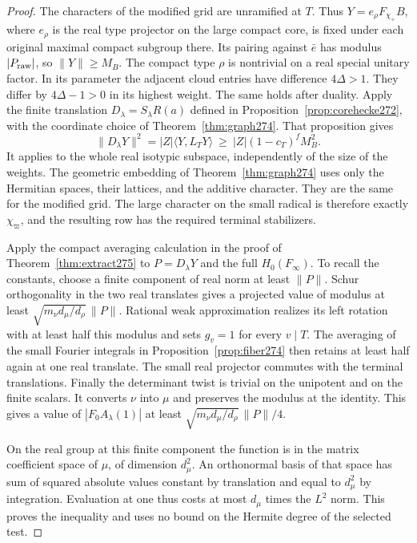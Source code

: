 \documentclass[a4paper,11pt]{article}
\theoremstyle{definition}
\theoremstyle{remark}
\numberwithin{equation}{section}
\begin{document}
\begin{proof}
The characters of the modified grid are unramified at \(T\).
Thus \(Y=e_\rho F_{\chi_+}B\), where \(e_\rho\) is the real
type projector on the large compact core, is fixed under
each original maximal compact subgroup there. Its pairing
against \(\bar e\) has modulus \(|P_{\rm raw}|\), so
\(\|Y\|\ge M_B\). The compact type \(\rho\) is nontrivial
on a real special unitary factor. In its parameter the
adjacent cloud entries have difference \(4\Delta>1\).
They differ by \(4\Delta-1>0\) in its highest weight.
The same holds after duality. Apply the finite translation
\(D_\lambda=S_\lambda R(a)\) defined in
Proposition~\ref{prop:corehecke272}, with the coordinate
choice of Theorem~\ref{thm:graph274}. That proposition gives
\[
 \|D_\lambda Y\|^2=|Z|\langle Y,L_TY\rangle
             \ \ge\ |Z|(1-c_T)^f M_B^2 .
\]
It applies to the whole real isotypic subspace, independently
of the size of the weights. The geometric embedding of
Theorem~\ref{thm:graph274} uses only the Hermitian spaces,
their lattices, and the additive character. They are the same
for the modified grid. The large character on the small
radical is therefore exactly \(\chi_\varpi\), and the
resulting row has the required terminal stabilizers.

Apply the compact averaging calculation in the proof of
Theorem~\ref{thm:extract275} to \(P=D_\lambda Y\) and the
full \(H_0(F_\infty)\). To recall the constants, choose a
finite component of real norm at least \(\|P\|\).
Schur orthogonality in the two real translates gives a
projected value of modulus at least
\(\sqrt{m_\nu d_\mu/d_\rho}\,\|P\|\).
Rational weak approximation realizes its left rotation
with at least half this modulus and sets \(g_v=1\)
for every \(v\mid T\). The averaging of the small Fourier
integrals in Proposition~\ref{prop:fiber274} then retains
at least half again at one real translate. The small real
projector commutes with the terminal translations. Finally
the determinant twist is trivial on the unipotent and on
the finite scalars. It converts \(\nu\) into \(\mu\) and
preserves the modulus at the identity. This gives a value of
\(|F_0A_\lambda(1)|\) at least
\(\sqrt{m_\nu d_\mu/d_\rho}\,\|P\|/4\).

On the real group at this finite component the function is
in the matrix coefficient space of \(\mu\), of dimension
\(d_\mu^2\). An orthonormal basis of that space has sum of
squared absolute values constant by translation and equal to
\(d_\mu^2\) by integration. Evaluation at one thus costs at
most \(d_\mu\) times the \(L^2\) norm. This proves the
inequality and uses no bound on the Hermite degree of the
selected test.
\end{proof}
\end{document}
